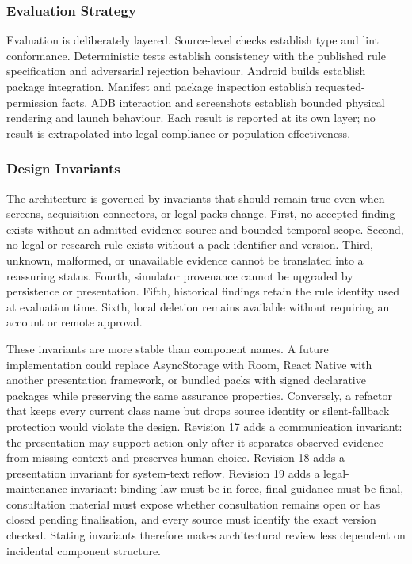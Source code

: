 \subsubsection{Evaluation Strategy}

Evaluation is deliberately layered. Source-level checks establish type and lint conformance. Deterministic tests establish consistency with the published rule specification and adversarial rejection behaviour. Android builds establish package integration. Manifest and package inspection establish requested-permission facts. ADB interaction and screenshots establish bounded physical rendering and launch behaviour. Each result is reported at its own layer; no result is extrapolated into legal compliance or population effectiveness.

\subsubsection{Design Invariants}

The architecture is governed by invariants that should remain true even when screens, acquisition connectors, or legal packs change. First, no accepted finding exists without an admitted evidence source and bounded temporal scope. Second, no legal or research rule exists without a pack identifier and version. Third, unknown, malformed, or unavailable evidence cannot be translated into a reassuring status. Fourth, simulator provenance cannot be upgraded by persistence or presentation. Fifth, historical findings retain the rule identity used at evaluation time. Sixth, local deletion remains available without requiring an account or remote approval.

These invariants are more stable than component names. A future implementation could replace AsyncStorage with Room, React Native with another presentation framework, or bundled packs with signed declarative packages while preserving the same assurance properties. Conversely, a refactor that keeps every current class name but drops source identity or silent-fallback protection would violate the design. Revision 17 adds a communication invariant: the presentation may support action only after it separates observed evidence from missing context and preserves human choice. Revision 18 adds a presentation invariant for system-text reflow. Revision 19 adds a legal-maintenance invariant: binding law must be in force, final guidance must be final, consultation material must expose whether consultation remains open or has closed pending finalisation, and every source must identify the exact version checked. Stating invariants therefore makes architectural review less dependent on incidental component structure.

